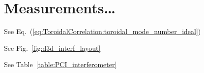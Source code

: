 \chapter{Measurements\ldots}


See Eq.~(\ref{eq:ToroidalCorrelation:toroidal_mode_number_ideal})

\noindent See Fig.~\ref{fig:d3d_interf_layout}

\noindent See Table~\ref{table:PCI_interferometer}
